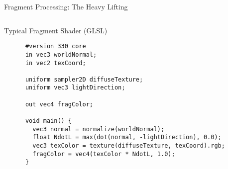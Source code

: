 \begin{frame}[fragile]{Fragment Processing: The Heavy Lifting}
\begin{columns}
\begin{column}{0.5\textwidth}
    \end{column}
  \end{columns}

  \pause
  \begin{mathbox}{Typical Fragment Shader (GLSL)}
    \footnotesize
    \begin{verbatim}
      #version 330 core
      in vec3 worldNormal;
      in vec2 texCoord;

      uniform sampler2D diffuseTexture;
      uniform vec3 lightDirection;

      out vec4 fragColor;

      void main() {
        vec3 normal = normalize(worldNormal);
        float NdotL = max(dot(normal, -lightDirection), 0.0);
        vec3 texColor = texture(diffuseTexture, texCoord).rgb;
        fragColor = vec4(texColor * NdotL, 1.0);
      }
    \end{verbatim}
  \end{mathbox}
\end{frame}

